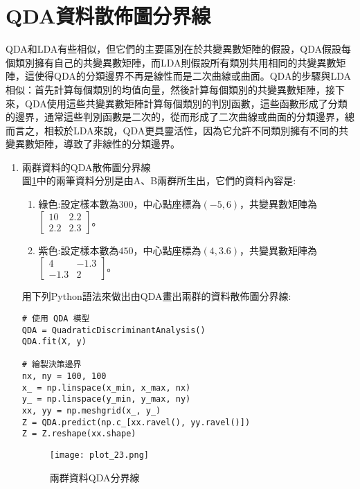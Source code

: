 \documentclass[12pt, a4paper]{article}
\begin{document}
\section{QDA資料散佈圖分界線}
QDA和LDA有些相似，但它們的主要區別在於共變異數矩陣的假設，QDA假設每個類別擁有自己的共變異數矩陣，而LDA則假設所有類別共用相同的共變異數矩陣，這使得QDA的分類邊界不再是線性而是二次曲線或曲面。QDA的步驟與LDA相似：首先計算每個類別的均值向量，然後計算每個類別的共變異數矩陣，接下來，QDA使用這些共變異數矩陣計算每個類別的判別函數，這些函數形成了分類的邊界，通常這些判別函數是二次的，從而形成了二次曲線或曲面的分類邊界，總而言之，相較於LDA來說，QDA更具靈活性，因為它允許不同類別擁有不同的共變異數矩陣，導致了非線性的分類邊界。
\begin{enumerate}
\item 兩群資料的QDA散佈圖分界線\\
圖\;\ref{fig:plot_23.png}\;中的兩筆資料分別是由A、B兩群所生出，它們的資料內容是\;:
\begin{enumerate}
\item 綠色\;:\;設定樣本數為\;$300$\;，中心點座標為\;$(-5,6)$\;，共變異數矩陣為\;$\begin{bmatrix}10 & 2.2 \\2.2 & 2.3 \end{bmatrix}$\;。
\item 紫色\;:\;設定樣本數為\;$450$\;，中心點座標為\;$(4,3.6)$\;，共變異數矩陣為\;$\begin{bmatrix}4 & -1.3 \\-1.3 & 2 \end{bmatrix}$\;。
\end{enumerate}

用下列Python語法來做出由QDA畫出兩群的資料散佈圖分界線\;:
\begin{lstlisting}
# 使用 QDA 模型
QDA = QuadraticDiscriminantAnalysis()
QDA.fit(X, y)  

# 繪製決策邊界
nx, ny = 100, 100
x_ = np.linspace(x_min, x_max, nx)
y_ = np.linspace(y_min, y_max, ny)
xx, yy = np.meshgrid(x_, y_)
Z = QDA.predict(np.c_[xx.ravel(), yy.ravel()])
Z = Z.reshape(xx.shape)
\end{lstlisting}

\begin{figure}[H]
\centering
\texttt{[image: plot\_23.png]}
\caption{兩群資料QDA分界線}
\label{fig:plot_23.png}
\end{figure}


\end{enumerate}
\end{document}
